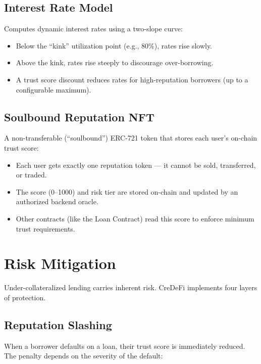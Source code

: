 \documentclass[12pt, a4paper]{article}
\begin{document}
\subsection{Interest Rate Model}

Computes dynamic interest rates using a two-slope curve:
\begin{itemize}[nosep]
    \item Below the ``kink'' utilization point (e.g., 80\%), rates rise slowly.
    \item Above the kink, rates rise steeply to discourage over-borrowing.
    \item A trust score discount reduces rates for high-reputation borrowers (up to a configurable maximum).
\end{itemize}

\subsection{Soulbound Reputation NFT}

A non-transferable (``soulbound'') ERC-721 token that stores each user's on-chain trust score:
\begin{itemize}[nosep]
    \item Each user gets exactly one reputation token --- it cannot be sold, transferred, or traded.
    \item The score (0--1000) and risk tier are stored on-chain and updated by an authorized backend oracle.
    \item Other contracts (like the Loan Contract) read this score to enforce minimum trust requirements.
\end{itemize}


\section{Risk Mitigation}

Under-collateralized lending carries inherent risk. CreDeFi implements four layers of protection.

\subsection{Reputation Slashing}

When a borrower defaults on a loan, their trust score is immediately reduced. The penalty depends on the severity of the default:
\end{document}
